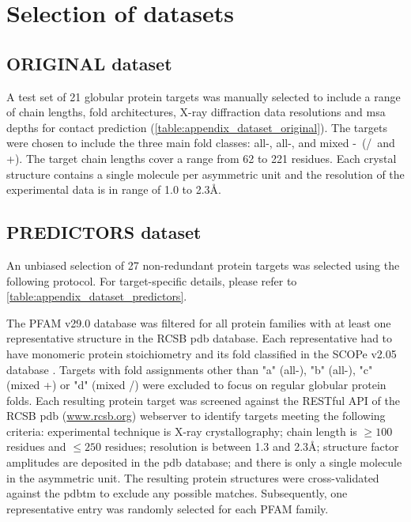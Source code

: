 \section{Selection of datasets}
\subsection{ORIGINAL dataset} \label{sec:methods_dataset_original}
A test set of 21 globular protein targets was manually selected to include a range of chain lengths, fold architectures, X-ray diffraction data resolutions and \gls{msa} depths for contact prediction  (\cref{table:appendix_dataset_original}). The targets were chosen to include the three main fold classes: all-\textalpha, all-\textbeta, and mixed \textalpha-\textbeta\ (\textalpha/\textbeta\ and \textalpha+\textbeta). The target chain lengths cover a range from 62 to 221 residues. Each crystal structure contains a single molecule per asymmetric unit and the resolution of the experimental data is in range of 1.0 to 2.3\AA.

\subsection{PREDICTORS dataset} \label{sec:methods_dataset_predictors}
An unbiased selection of 27 non-redundant protein targets was selected using the following protocol. For target-specific details, please refer to \cref{table:appendix_dataset_predictors}.

The PFAM v29.0 \cite{Finn2016-zo} database was filtered for all protein families with at least one representative structure in the RCSB \gls{pdb} \cite{Berman2000-ua} database. Each representative had to have monomeric protein stoichiometry and its fold classified in the SCOPe v2.05 database \cite{Chandonia2017-vf}. Targets with fold assignments other than "a" (all-\textalpha), "b" (all-\textbeta), "c" (mixed \textalpha+\textbeta) or "d" (mixed \textalpha/\textbeta) were excluded to focus on regular globular protein folds. Each resulting protein target was screened against the RESTful API of the RCSB \gls{pdb} (\url{www.rcsb.org}) webserver to identify targets meeting the following criteria: experimental technique is X-ray crystallography; chain length is $\geq100$ residues and $\leq250$ residues; resolution is between 1.3 and 2.3\AA; structure factor amplitudes are deposited in the \gls{pdb} \cite{Berman2000-ua} database; and there is only a single molecule in the asymmetric unit. The resulting protein structures were cross-validated against the \gls{pdbtm} \cite{Tusnady2005-ns} to exclude any possible matches. Subsequently, one representative entry was randomly selected for each PFAM family.

